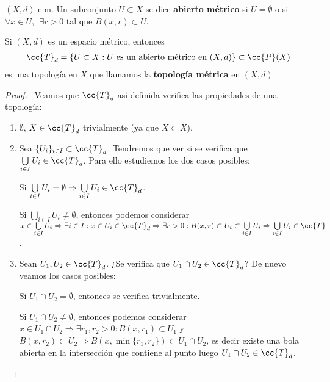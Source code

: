 \begin{definicion}
    $(X,d)$ e.m. Un subconjunto $U \subset X$ se dice \textbf{abierto métrico} si $U=\emptyset$ o si $\forall x \in U, \ \ \exists r > 0$ tal que $B(x,r) \subset U$.
    \endsquare
\end{definicion}

\begin{prop} %
    Si $(X,d)$ es un espacio métrico, entonces 
    \begin{gather*}
        \cc{T}_d=\{U \subset X : U \text{ es un abierto métrico en }(X,d)\} \subset \cc{P}(X)
    \end{gather*}
    es una topología en $X$ que llamamos la \textbf{topología métrica} en $(X,d)$.

    \begin{proof}\
        Veamos que $\cc{T}_d$ así definida verifica las propiedades de una topología:
        \begin{enumerate}[label=(A\arabic*)]
            \item $\emptyset$, $X\in \cc{T}_d$ trivialmente (ya que $X\subset X$).
            \item Sea $\{U_i\}_{i\in I}\subset \cc{T}_d$. Tendremos que ver si se verifica que $\bigcup\limits_{i\in I}U_i \in \cc{T}_d$. Para ello estudiemos los dos casos posibles:
            
            Si $\bigcup\limits_{i\in I}U_i = \emptyset \Rightarrow \bigcup\limits_{i\in I}U_i \in \cc{T}_d$.

            Si $\bigcup\limits_{i\in I}U_i \neq \emptyset$, entonces podemos considerar $x \in \bigcup\limits_{i\in I}U_i \Rightarrow \exists i \in I : x \in U_i \in \cc{T}_d \Rightarrow \exists r>0 : B(x,r) \subset U_i \subset \bigcup\limits_{i\in I}U_i \Rightarrow \bigcup\limits_{i\in I}U_i\in \cc{T}$.

            \item Sean $U_1, U_2 \in \cc{T}_d$. ¿Se verifica que $U_1 \cap U_2 \in \cc{T}_d$? De nuevo veamos los casos posibles:
            
            Si $U_1 \cap U_2 = \emptyset$, entonces se verifica trivialmente.

            Si $U_1 \cap U_2 \neq \emptyset$, entonces podemos considerar $x\in U_1 \cap U_2 \Rightarrow \exists r_1,r_2>0: B(x,r_1)\subset U_1$ y $B(x,r_2)\subset U_2 \Rightarrow B(x, \min\{r_1, r_2\}) \subset U_1 \cap U_2$, es decir existe una bola abierta en la intersección que contiene al punto luego $U_1 \cap U_2 \in \cc{T}_d$.
        \end{enumerate}
    \end{proof}
\end{prop}

